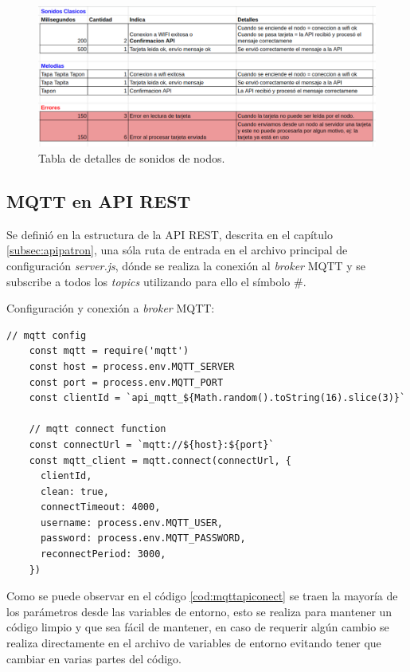 \begin{figure}[H]
	\centering
	\includegraphics[scale=.40]{./Figures/mqtt-sonidos-nodos.png}
	\caption{Tabla de detalles de sonidos de nodos.}
	\label{fig:mqttsonidosnodos}
\end{figure}



\subsection{MQTT en API REST}
\label{subsec:mqttapi}

Se definió en la estructura de la API REST, descrita en el capítulo \ref{subsec:apipatron}, una sóla ruta de entrada en el archivo principal de configuración \textit{server.js}, dónde se realiza la conexión al \textit{broker} MQTT y se subscribe a todos los \textit{topics} utilizando para ello el símbolo \#. 

Configuración y conexión a \textit{broker} MQTT:
\begin{lstlisting}[label=cod:mqttapiconect,caption= Configuración y conexión a \textit{broker} MQTT en API REST.]
 // mqtt config
    const mqtt = require('mqtt')
    const host = process.env.MQTT_SERVER
    const port = process.env.MQTT_PORT
    const clientId = `api_mqtt_${Math.random().toString(16).slice(3)}`
    
    // mqtt connect function
    const connectUrl = `mqtt://${host}:${port}`
    const mqtt_client = mqtt.connect(connectUrl, {
      clientId,
      clean: true,
      connectTimeout: 4000,
      username: process.env.MQTT_USER,
      password: process.env.MQTT_PASSWORD,
      reconnectPeriod: 3000,
    })
\end{lstlisting}

Como se puede observar en el código \ref{cod:mqttapiconect} se traen la mayoría de los parámetros desde las variables de entorno, esto se realiza para mantener un código limpio y que sea fácil de mantener, en caso de requerir algún cambio se realiza directamente en el archivo de variables de entorno evitando tener que cambiar en varias partes del código.

